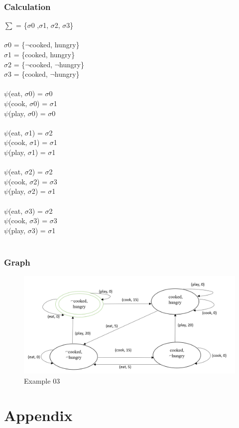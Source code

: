 \documentclass[11pt]{article}
\begin{document}
	\subsubsection{Calculation}\label{par:p303}
	$\sum$ = \{$\sigma$0 ,$\sigma$1, $\sigma$2, $\sigma$3\}\\
	\\
	$\sigma$0 = \{$\neg$cooked, hungry\}\\
	$\sigma$1 = \{cooked, hungry\}\\
	$\sigma$2 = \{$\neg$cooked, $\neg$hungry\}\\
	$\sigma$3 = \{cooked, $\neg$hungry\}\\
	\\
	$\psi$(eat, $\sigma$0) = $\sigma$0\\
	$\psi$(cook, $\sigma$0) = $\sigma$1\\
	$\psi$(play, $\sigma$0) = $\sigma$0\\
	\\
	$\psi$(eat, $\sigma$1) = $\sigma$2\\
	$\psi$(cook, $\sigma$1) = $\sigma$1\\
	$\psi$(play, $\sigma$1) = $\sigma$1\\
	\\
	$\psi$(eat, $\sigma$2) = $\sigma$2\\
	$\psi$(cook, $\sigma$2) = $\sigma$3\\
	$\psi$(play, $\sigma$2) = $\sigma$1\\
	\\
	$\psi$(eat, $\sigma$3) = $\sigma$2\\
	$\psi$(cook, $\sigma$3) = $\sigma$3\\
	$\psi$(play, $\sigma$3) = $\sigma$1\\
	\\
	\subsubsection{Graph}\label{par:p403}
	\begin{figure}[H]
		\includegraphics[width=1\linewidth, height=0.3\textheight]{./media/figure01.png}
		\caption{Example 03}
		\label{Figure:f03}
	\end{figure}
\newpage
\section{Appendix}	
\begin{appendix}
\listoffigures
\listoftables
\end{appendix}
\end{document}
